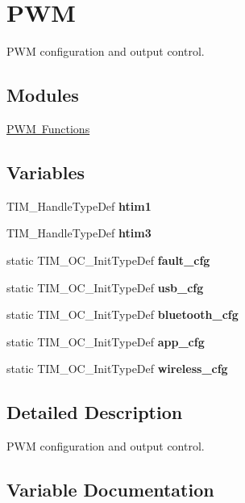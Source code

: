 \hypertarget{group___s_d___p_w_m}{}\section{P\+WM}
\label{group___s_d___p_w_m}


P\+WM configuration and output control.  


\subsection*{Modules}
\begin{DoxyCompactItemize}
\item 
\mbox{\hyperlink{group___s_d___p_w_m___functions}{P\+W\+M Functions}}
\end{DoxyCompactItemize}
\subsection*{Variables}
\begin{DoxyCompactItemize}
\item 
\mbox{\label{group___s_d___p_w_m_ga25fc663547539bc49fecc0011bd76ab5}} 
T\+I\+M\+\_\+\+Handle\+Type\+Def {\bfseries htim1}
\item 
\mbox{\label{group___s_d___p_w_m_gaac3d2c59ee0e3bbae1b99529a154eb62}} 
T\+I\+M\+\_\+\+Handle\+Type\+Def {\bfseries htim3}
\item 
static T\+I\+M\+\_\+\+O\+C\+\_\+\+Init\+Type\+Def {\bfseries fault\+\_\+cfg}
\item 
static T\+I\+M\+\_\+\+O\+C\+\_\+\+Init\+Type\+Def {\bfseries usb\+\_\+cfg}
\item 
static T\+I\+M\+\_\+\+O\+C\+\_\+\+Init\+Type\+Def {\bfseries bluetooth\+\_\+cfg}
\item 
static T\+I\+M\+\_\+\+O\+C\+\_\+\+Init\+Type\+Def {\bfseries app\+\_\+cfg}
\item 
static T\+I\+M\+\_\+\+O\+C\+\_\+\+Init\+Type\+Def {\bfseries wireless\+\_\+cfg}
\end{DoxyCompactItemize}


\subsection{Detailed Description}
P\+WM configuration and output control. 



\subsection{Variable Documentation}
\mbox{\label{group___s_d___p_w_m_gaafad42a9d0bd4a3186e1c78c6bf1796e}} 
